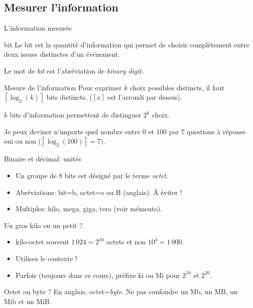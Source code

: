 \subsection{Mesurer l'information}
\begin{frame}[label=mesure]{L'information mesurée}
  \begin{block}{bit}
    Le bit est la quantité d'information qui permet de choisir
    complètement entre deux issues distinctes d'un événement.

    Le mot de \emph{bit} est l'abréviation de \emph{binary digit}.
  \end{block}
  \begin{block}{Mesure de l'information}
    Pour exprimer $k$ choix possibles distincts, il faut
    $\left\lceil\log_2(k)\right\rceil$ bits distincts. ($\left\lceil
      x\right\rceil$ est l'arrondi par dessus).

    $k$ bits d'information permettent de distinguer $2^k$ choix.
  \end{block}
  \begin{example}
    Je peux deviner n'importe quel nombre entre 0 et 100 par 7 questions
    à réponse oui ou non ($\left\lceil\log_2(100)\right\rceil=7)$.
    \begin{presentationonly}\hfill\hyperlink{fakira}{}\end{presentationonly}
  \end{example}
\end{frame}
\begin{frame}{Binaire et décimal: unités}
  \begin{itemize}
  \item Un groupe de 8 bits est désigné par le terme \emph{octet}.
  \item Abréviations: bit=b, octet=o ou B (anglais). À éviter !
  \item Multiples: kilo, mega, giga, tera (voir mémento).
  \end{itemize}
  \begin{alertblock}{Un gros kilo ou un petit ?}
    \begin{itemize}
    \item[\dialogwarning] kilo-octet souvent $1\,024=2^{10}$ octets et non $10^3=1\,000$.
    \item[\dialogsystem] Utilisez le contexte !
    \item[\dialoginformation] Parfois (toujours dans ce cours), préfixe ki ou Mi pour $2^{10}$ et $2^{20}$.
    \end{itemize}
  \end{alertblock}
  \begin{alertblock}{Octet ou byte ?}
    En anglais, octet=\emph{byte}.
    Ne pas confondre un Mb, un MB, un Mib et un MiB.
  \end{alertblock}
\end{frame}
